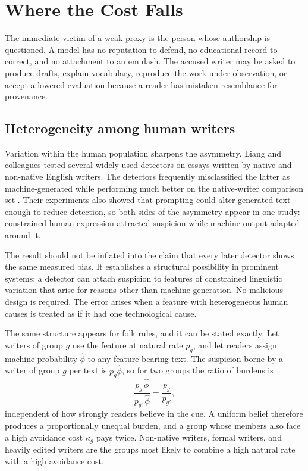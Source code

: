 \documentclass[11pt]{article}
\theoremstyle{plain}
\theoremstyle{definition}
\theoremstyle{remark}
\begin{document}
\section{Where the Cost Falls}\label{sec:cost}

The immediate victim of a weak proxy is the person whose authorship is questioned. A model has no reputation to defend, no educational record to correct, and no attachment to an em dash. The accused writer may be asked to produce drafts, explain vocabulary, reproduce the work under observation, or accept a lowered evaluation because a reader has mistaken resemblance for provenance.

\subsection{Heterogeneity among human writers}

Variation within the human population sharpens the asymmetry. Liang and colleagues tested several widely used detectors on essays written by native and non-native English writers. The detectors frequently misclassified the latter as machine-generated while performing much better on the native-writer comparison set \cite{liang2023}. Their experiments also showed that prompting could alter generated text enough to reduce detection, so both sides of the asymmetry appear in one study: constrained human expression attracted suspicion while machine output adapted around it.

The result should not be inflated into the claim that every later detector shows the same measured bias. It establishes a structural possibility in prominent systems: a detector can attach suspicion to features of constrained linguistic variation that arise for reasons other than machine generation. No malicious design is required. The error arises when a feature with heterogeneous human causes is treated as if it had one technological cause.

The same structure appears for folk rules, and it can be stated exactly. Let writers of group $g$ use the feature at natural rate $p_g$, and let readers assign machine probability $\hat\phi$ to any feature-bearing text. The suspicion borne by a writer of group $g$ per text is $p_g\hat\phi$, so for two groups the ratio of burdens is
\[
\frac{p_g\,\hat\phi}{p_{g'}\,\hat\phi}=\frac{p_g}{p_{g'}},
\]
independent of how strongly readers believe in the cue. A uniform belief therefore produces a proportionally unequal burden, and a group whose members also face a high avoidance cost $\kappa_g$ pays twice. Non-native writers, formal writers, and heavily edited writers are the groups most likely to combine a high natural rate with a high avoidance cost.
\end{document}
